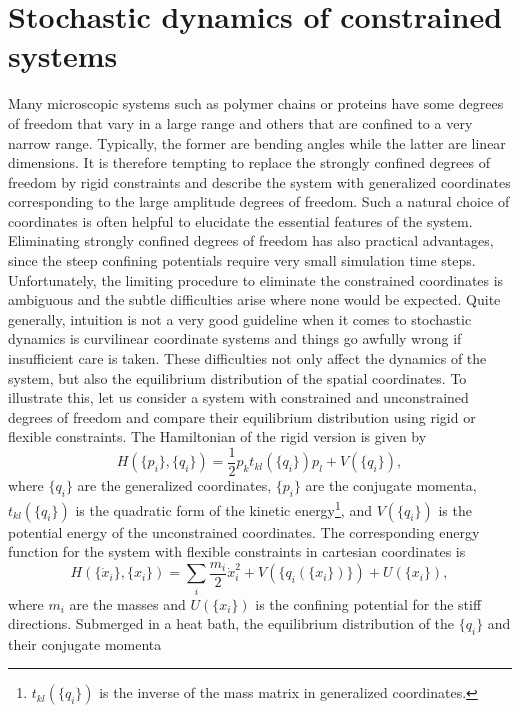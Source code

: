 \section{Stochastic dynamics of constrained systems}
Many microscopic systems such as polymer chains or proteins have some degrees of freedom 
that vary in a large range and others that are confined to a very narrow range. Typically, the former are
bending angles while the latter are linear dimensions. It is therefore tempting
to replace the strongly confined degrees of freedom by rigid constraints and describe the
system with generalized coordinates corresponding to the large amplitude degrees of freedom. 
Such a natural choice of coordinates is often helpful to elucidate the essential features of the 
system. Eliminating strongly confined degrees of freedom has also practical 
advantages, since the steep confining potentials require very small simulation time steps.
Unfortunately, the limiting procedure to eliminate the constrained coordinates is ambiguous and
the subtle difficulties arise where none would be expected. Quite generally, intuition is not a very
good guideline when it comes to stochastic dynamics is curvilinear coordinate systems and things
go awfully wrong if insufficient care is taken. 
These difficulties not only affect the dynamics of the system, but also the equilibrium distribution
of the spatial coordinates. To illustrate this, let us consider a system with constrained and 
unconstrained degrees of freedom and compare their equilibrium distribution using rigid or 
flexible constraints. The Hamiltonian of the rigid version is given by 
\begin{equation}
H(\{p_i\},\{q_i\})= \frac{1}{2} p_k t_{kl}(\{q_i\})p_l+V(\{q_i\}), 
\end{equation}
where $\{q_i\}$ are the generalized coordinates, $\{p_i\}$ are the conjugate momenta,  
$t_{kl}(\{q_i\})$ is the quadratic form of the kinetic energy\footnote{
$t_{kl}(\{q_i\})$ is the inverse of the mass matrix in generalized coordinates.},
and $V(\{q_i\})$ is the potential energy of the unconstrained coordinates. 
The corresponding energy function for the system with flexible constraints 
 in cartesian coordinates is
\begin{equation}
H(\{\dot{x}_i\},\{x_i\})= \sum_i \frac{m_i}{2} \dot{x}_i^{2}+V(\{q_i(\{x_i\})\})+U(\{x_i\}), 
\end{equation}
where $m_i$ are the masses and $U(\{x_i\})$ is the confining potential for the stiff directions.
Submerged in a heat bath, the equilibrium distribution of the $\{q_i\}$ and their conjugate momenta

